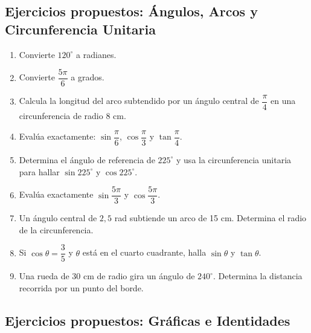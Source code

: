 \documentclass[12pt, letterpaper]{article}
\begin{document}
\newpage


\subsection{Ejercicios propuestos: Ángulos, Arcos y Circunferencia Unitaria}

\begin{enumerate}[resume=ejercicios, leftmargin=*]
  \item \facil{} Convierte $120^\circ$ a radianes.

  \item \facil{} Convierte $\dfrac{5\pi}{6}$ a grados.

  \item \medio{} Calcula la longitud del arco subtendido por un ángulo central de $\dfrac{\pi}{4}$ en una circunferencia de radio 8 cm.

  \item \medio{} Evalúa exactamente: $\sin \dfrac{\pi}{6}$, $\cos \dfrac{\pi}{3}$ y $\tan \dfrac{\pi}{4}$.

  \item \medio{} Determina el ángulo de referencia de $225^\circ$ y usa la circunferencia unitaria para hallar $\sin 225^\circ$ y $\cos 225^\circ$.

  \item \dificil{} Evalúa exactamente $\sin \dfrac{5\pi}{3}$ y $\cos \dfrac{5\pi}{3}$.

  \item \dificil{} Un ángulo central de $2{,}5$ rad subtiende un arco de 15 cm. Determina el radio de la circunferencia.

  \item \dificil{} Si $\cos \theta = \dfrac{3}{5}$ y $\theta$ está en el cuarto cuadrante, halla $\sin \theta$ y $\tan \theta$.

  \item \muyDificil{} Una rueda de 30 cm de radio gira un ángulo de $240^\circ$. Determina la distancia recorrida por un punto del borde.
\end{enumerate}

\subsection{Ejercicios propuestos: Gráficas e Identidades}
\end{document}
